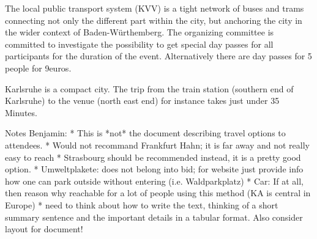 The local public transport system (KVV) is a tight network of buses and trams connecting not only the different part within the city, but anchoring the city in the wider context of Baden-Würthemberg. The organizing committee is committed to investigate the possibility to get special day passes for all participants for the duration of the event. Alternatively there are day passes for 5 people for 9euros.

Karlsruhe is a compact city. The trip from the train station (southern end of Karlsruhe) to the venue (north east end) for instance takes just under 35 Minutes.



Notes Benjamin:
 * This is *not* the document describing travel options to attendees.
 * Would not recommand Frankfurt Hahn; it is far away and not really easy to reach
 * Strasbourg should be recommended instead, it is a pretty good option.
 * Umweltplakete: does not belong into bid; for website just provide info how one can park outside without entering (i.e. Waldparkplatz)
 * Car: If at all, then reason why reachable for a lot of people using this method (KA is central in Europe)
 * need to think about how to write the text, thinking of a short summary sentence and the important details in a tabular format. Also consider layout for document!
